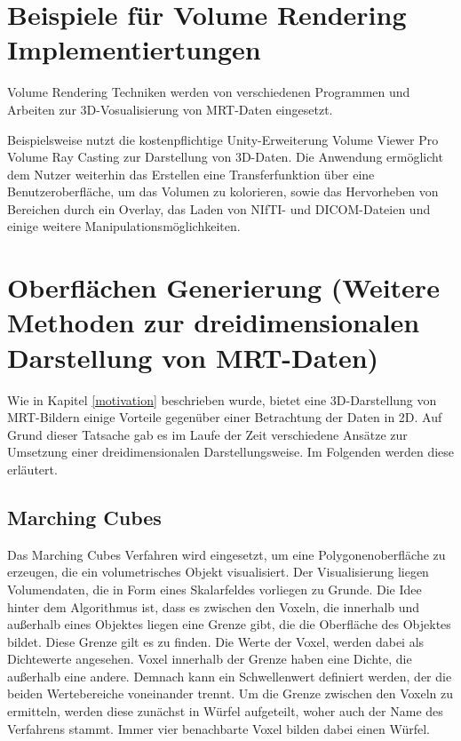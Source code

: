 \section{Beispiele für Volume Rendering Implementiertungen}

Volume Rendering Techniken werden von verschiedenen Programmen und Arbeiten zur 3D-Vosualisierung von MRT-Daten eingesetzt.

Beispielsweise nutzt die kostenpflichtige Unity-Erweiterung Volume Viewer Pro Volume Ray Casting zur Darstellung von 3D-Daten. Die Anwendung ermöglicht dem Nutzer weiterhin das Erstellen eine Transferfunktion über eine Benutzeroberfläche, um das Volumen zu kolorieren, sowie das Hervorheben von Bereichen durch ein Overlay, das Laden von NIfTI- und DICOM-Dateien und einige weitere Manipulationsmöglichkeiten. 
\cite{volumeViewerPro}


\section{Oberflächen Generierung (Weitere Methoden zur dreidimensionalen Darstellung von MRT-Daten)}		 %
Wie in Kapitel \ref{motivation} beschrieben wurde, bietet eine 3D-Darstellung von MRT-Bildern einige Vorteile gegenüber einer Betrachtung der Daten in 2D. 
Auf Grund dieser Tatsache gab es im Laufe der Zeit verschiedene Ansätze zur Umsetzung einer dreidimensionalen Darstellungsweise. 
Im Folgenden werden diese erläutert. 



\subsection{Marching Cubes}
\label{marchingCubes}

Das Marching Cubes Verfahren wird eingesetzt, um eine Polygonenoberfläche zu erzeugen, die ein volumetrisches Objekt visualisiert. 
Der Visualisierung liegen Volumendaten, die in Form eines Skalarfeldes vorliegen zu Grunde.
Die Idee hinter dem Algorithmus ist, dass es zwischen den Voxeln, die innerhalb und außerhalb eines Objektes liegen eine Grenze gibt, die die Oberfläche des Objektes bildet. Diese Grenze gilt es zu finden. 
Die Werte der Voxel, werden dabei als Dichtewerte angesehen. Voxel innerhalb der Grenze haben eine Dichte, die außerhalb eine andere. Demnach kann ein Schwellenwert definiert werden, der die beiden Wertebereiche voneinander trennt.
Um die Grenze zwischen den Voxeln zu ermitteln, werden diese zunächst in Würfel aufgeteilt, woher auch der Name des Verfahrens stammt. Immer vier benachbarte Voxel bilden dabei einen Würfel.  

